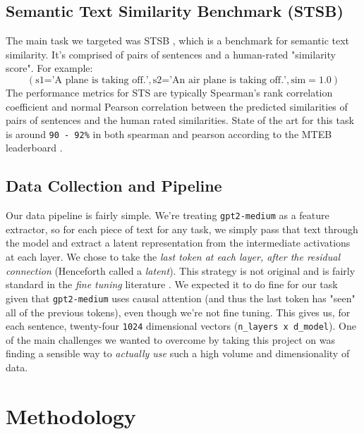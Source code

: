 \documentclass[14pt]{article}
\begin{document}
\subsection{Semantic Text Similarity Benchmark (STSB)} \label{STS-section}
The main task we targeted was STSB \cite{STS}, which is a benchmark for semantic text similarity. It's comprised of pairs of sentences and a human-rated "similarity score". For example:
$$
(\text{s1='A plane is taking off.'}, \text{s2='An air plane is taking off.'}, \text{sim}=1.0)
$$
The performance metrics for STS are typically Spearman's rank correlation coefficient and normal Pearson correlation between the predicted similarities of pairs of sentences and the human rated similarities. State of the art for this task is around \verb|90 - 92%| in both spearman and pearson according to the MTEB leaderboard \cite{muennighoff2022mteb}.

\subsection{Data Collection and Pipeline} \label{latent}
Our data pipeline is fairly simple. We're treating \verb|gpt2-medium| as a feature extractor, so for each piece of text for any task, we simply pass that text through the model and extract a latent representation from the intermediate activations at each layer. We chose to take the \textit{last token at each layer, after the residual connection} (Henceforth called a \textit{latent}). This strategy is not original and is fairly standard in the \textit{fine tuning} literature \cite{LLMEmbed}. We expected it to do fine for our task given that \verb|gpt2-medium| uses causal attention (and thus the last token has "seen" all of the previous tokens), even though we're not fine tuning. This gives us, for each sentence, twenty-four \verb|1024| dimensional vectors (\verb|n_layers x d_model|). One of the main challenges we wanted to overcome by taking this project on was finding a sensible way to \textit{actually use} such a high volume and dimensionality of data.


\section{Methodology}
\end{document}
